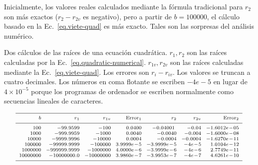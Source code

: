 Inicialmente, los valores reales calculados mediante la fórmula tradicional para $r_2$ son más exactos ($r_2-r_{2v}$ es negativo), pero a partir de $b=100000$, el cálculo basado en la Ec.~\ref{eq.viete-quad} es más exacto. Tales son las sorpresas del análisis numérico.

\begin{table}[bht]
\caption[Dos cálculos de las raíces de una ecuación cuadrática]{Dos cálculos de las raíces de una ecuación cuadrática. $r_1,r_2$ son las raíces calculadas por la Ec.~\ref{eq.quadratic-numerical}. $r_{1v},r_{2v}$ son las raíces calculadas mediante la Ec.~\ref{eq.viete-quad}. Los errores son $r_{i}-r_{iv}$. Los valores se truncan a cuatro decimales.
Los números en coma flotante se escriben $-4e-5$ en lugar de $4\times 10^{-5}$ porque los programas de ordenador se escriben normalmente como secuencias lineales de caracteres.} \label{t.quadratic}
\[
\begin{scriptsize}
\begin{array}{r@{\hspace{2.5mm}}r@{\hspace{2.5mm}}r@{\hspace{2.5mm}}r@{\hspace{2.5mm}}r@{\hspace{2.5mm}}r@{\hspace{2.5mm}}r}
\hline
\noalign{\smallskip}
b & r_1 & r_{1v} & \mathrm{Error}_1 & r_2 & r_{2v} & \mathrm{Error}_2\\
\noalign{\smallskip}\hline\noalign{\smallskip}
100  &  -99.9599  &  -100  &  0.0400  &  -0.04001\  &  -0.04  &  -1.6012e\!-\!05\\
1000  &  -999.9959  &  -1000  &  0.0040  &  -0.0040  &  -0.004  &  -1.6000e\!-\!08\\
10000  &  -9999.9996  &  -10000  &  0.0004  &  -0.0004  &  -0.0004  &  -1.6270e\!-\!11\\
100000  &  -99999.9999  &  -100000  &  3.9999e\!-\!5  &  -3.9999e\!-\!5  &  -4e\!-\!5  &  1.0104e\!-\!12\\
1000000  &  -999999.9999  &  -1000000  &  4.0000e\!-\!6  &  -3.9999e\!-\!6  &  -4e\!-\!6  &  2.7749e\!-\!11\\
10000000  &  -10000000.0  &  -10000000  &  3.9860e\!-\!7  &  -3.9953e\!-\!7  &  -4e\!-\!7  &  4.6261e\!-\!10\\
 \noalign{\smallskip}
 \hline
\end{array}
\end{scriptsize}
\]
\end{table}

